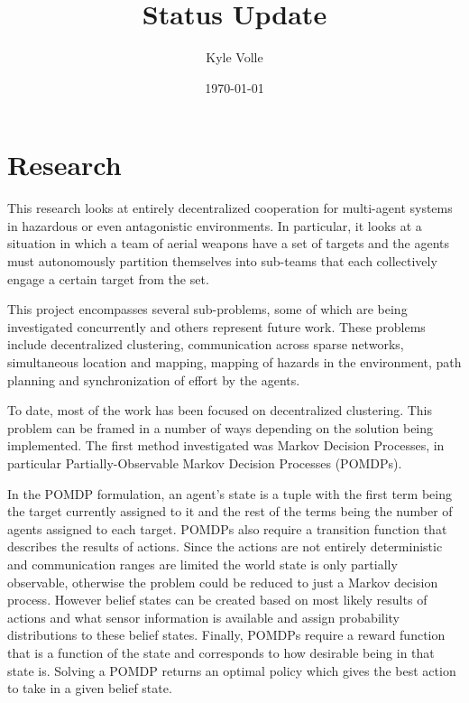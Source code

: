 \documentclass{article}
\title{Status Update}
\author{Kyle Volle}
\date{\today} %
\begin{document}
\maketitle


\section{Research}

This research looks at entirely decentralized cooperation for multi-agent systems in hazardous or even antagonistic environments. In particular, it looks at a situation in which a team of aerial weapons have a set of targets and the agents must autonomously partition themselves into sub-teams that each collectively engage a certain target from the set. 

This project encompasses several sub-problems, some of which are being investigated concurrently and others represent future work. These problems include decentralized clustering, communication across sparse networks, simultaneous location and mapping, mapping of hazards in the environment, path planning and synchronization of effort by the agents.

To date, most of the work has been focused on decentralized clustering. This problem can be framed in a number of ways depending on the solution being implemented. The first method investigated was Markov Decision Processes, in particular Partially-Observable Markov Decision Processes (POMDPs).

In the POMDP formulation, an agent's state is a tuple with the first term being the target currently assigned to it and the rest of the terms being the number of agents assigned to each target.  POMDPs also require a transition function that describes the results of actions. Since the actions are not entirely deterministic and communication ranges are limited the world state is only partially observable, otherwise the problem could be reduced to just a Markov decision process. However belief states can be created based on most likely results of actions and what sensor information is available and assign probability distributions to these belief states. Finally, POMDPs require a reward function that is a function of the state and corresponds to how desirable being in that state is. Solving a POMDP returns an optimal policy which gives the best action to take in a given belief state.
\end{document}

